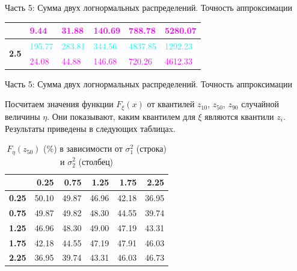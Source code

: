 \documentclass[ucs, notheorems, handout]{beamer}
\begin{document}
\begin{frame}{Часть 5: Сумма двух логнормальных распределений. Точность аппроксимации}
\begin{table}[]
\begin{tabular}{|c|l|l|l|l|l|}
				& \textcolor{magenta}{9.44}          & \textcolor{magenta}{31.88}         & \textcolor{magenta}{140.69}        & \textcolor{magenta}{788.78}        & \textcolor{magenta}{5280.07}      \\ \hline
				\multirow{2}{*}{\textbf{2.5}}  & \textcolor{cyan}{195.77}        & \textcolor{cyan}{283.81}        & \textcolor{cyan}{344.56}        & \textcolor{cyan}{4837.85}       & \textcolor{cyan}{1292.23}      \\ \cline{2-6} 
				& \textcolor{magenta}{24.08}         & \textcolor{magenta}{44.88}         & \textcolor{magenta}{146.68}        & \textcolor{magenta}{720.26}        & \textcolor{magenta}{4612.33}      \\ \hline
			\end{tabular}
		\end{table}
		
	\end{frame}
	
	
	\begin{frame}{Часть 5: Сумма двух логнормальных распределений. Точность аппроксимации}
		
		Посчитаем значения функции $F_{\xi}(x)$ от квантилей $z_{10}$, $z_{50}$, $z_{90}$ случайной величины $\eta$. Они показывают, каким квантилем для $\xi$ являются квантили $z_{i}$. Результаты приведены в следующих таблицаx.
		
		\begin{table}[!hhh]
			\centering
			\caption{$F_{\eta}(z_{50})$ ($\%$) в зависимости от $\sigma_{1}^{2}$ (строка) и $\sigma_{2}^{2}$ (столбец) }
			\label{tab4}
			\begin{tabular}{rrrrrr}
				\hline
				& \textbf{0.25} & \textbf{0.75} & \textbf{1.25} & \textbf{1.75} & \textbf{2.25} \\ 
				\hline
				\textbf{0.25} & 50.10 & 49.87 & 46.96 & 42.18 & 36.95 \\ 
				\textbf{0.75} & 49.87 & 49.82 & 48.30 & 44.55 & 39.74 \\ 
				\textbf{1.25} & 46.96 & 48.30 & 49.00 & 47.19 & 43.31 \\ 
				\textbf{1.75} & 42.18 & 44.55 & 47.19 & 47.91 & 46.03 \\ 
				\textbf{2.25} & 36.95 & 39.74 & 43.31 & 46.03 & 46.73 \\ 
				\hline
			\end{tabular}
		\end{table}
		
	\end{frame}
	
\end{document}
